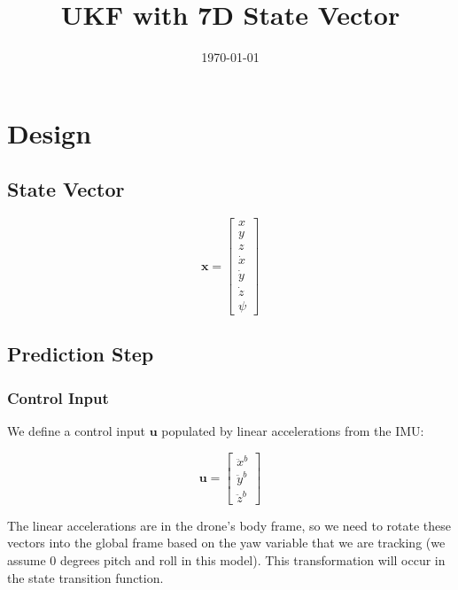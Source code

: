 \documentclass{article}
\title{UKF with 7D State Vector}
\author{\todo{Student name here}}
\date{\today}
\begin{document}
\maketitle

\section{Design}

\subsection{State Vector}

\begin{equation}
\mathbf{x} = \begin{bmatrix}
x \\
y \\
z \\
\dot x \\
\dot y \\
\dot z \\
\psi \end{bmatrix}
\end{equation}

\subsection{Prediction Step}

\subsubsection{Control Input}

We define a control input $\mathbf{u}$ populated by linear accelerations from the IMU:

\begin{equation}
\mathbf{u} = \begin{bmatrix}
\ddot x^b \\
\ddot y^b \\
\ddot z^b
\end{bmatrix}
\end{equation}

The linear accelerations are in the drone's body frame, so we need to rotate these vectors into the global frame based on the yaw variable that we are tracking (we assume 0 degrees pitch and roll in this model). This transformation will occur in the state transition function.
\end{document}
